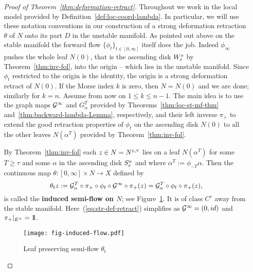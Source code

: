 \documentclass{article}
\begin{document}
\begin{proof}[Proof of Theorem~\ref{thm:deformation-retract}]
Throughout we work in the local model provided by Definition~\ref{def:loc-coord-lambda}.
In particular, we will use these notation conventions in our construction of a strong
deformation retraction $\theta$ of $N$ onto its part $D$ in the unstable manifold.
As pointed out above on the stable manifold the forward flow $\{\phi_t\}_{t\in[0,\infty]}$
itself does the job. Indeed $\phi_\infty$ pushes the whole leaf $N(0)$, that is the ascending disk
$W^s_{\varepsilon}$ by Theorem~\ref{thm:inv-fol}, into the origin -- which lies in the unstable manifold.
Since $\phi_t$ restricted to the origin is the identity, the origin is a strong deformation retract of $N(0)$.
If the Morse index $k$ is zero, then $N=N(0)$ and we are done; similarly for $k=n$.
%
Assume from now on $1\le k\le n-1$. The main idea is to use the graph
maps ${\mathcal{G}}^\infty$ and $G^T_\alpha$ provided by
Theorems~\ref{thm:loc-st-mf-thm} and~\ref{thm:backward-lambda-Lemma}, respectively,
and their left inverse $\pi_+$ to extend the good retraction properties of  $\phi_t$ on the
ascending disk $N(0)$ to all the other leaves $N(\alpha^T)$ provided
by Theorem~\ref{thm:inv-fol}.

\begin{definition}
\label{def:induced-semi-flow}
By Theorem~\ref{thm:inv-fol} each $z\in N=N^{{\varepsilon},\tau}$ lies on a leaf
$N(\alpha^T)$ for some $T\ge\tau$ and some $\alpha$ in the ascending
disk $S^u_{\varepsilon}$ and where $\alpha^T:=\phi_{-T}\alpha$.
Then the continuous map $\theta:[0,\infty]\times N\to X$ defined by
\begin{equation}\label{eq:str-def-retract}
     \theta_t z
     :=\Gg_\alpha^T\circ\pi_+\circ \phi_t\circ\Gg^\infty\circ \pi_+(z)
     =\Gg_\alpha^T\circ\phi_t\circ\pi_+(z),
\end{equation}
is called the {\bf induced semi-flow on \boldmath $N$}; see Figure~\ref{fig:fig-induced-flow}.
It is of class $C^r$ away from the stable manifold. Here~(\ref{eq:str-def-retract})
simplifies as ${\mathcal{G}}^\infty=(0,id)$ and $\pi_+|_{E^+}=\1$.
\end{definition}

\begin{figure}%
  \centering
  \texttt{[image: fig-induced-flow.pdf]}
  \caption{Leaf preserving semi-flow $\theta_t$
          }
  \label{fig:fig-induced-flow}
\end{figure}


\end{proof}
\end{document}
